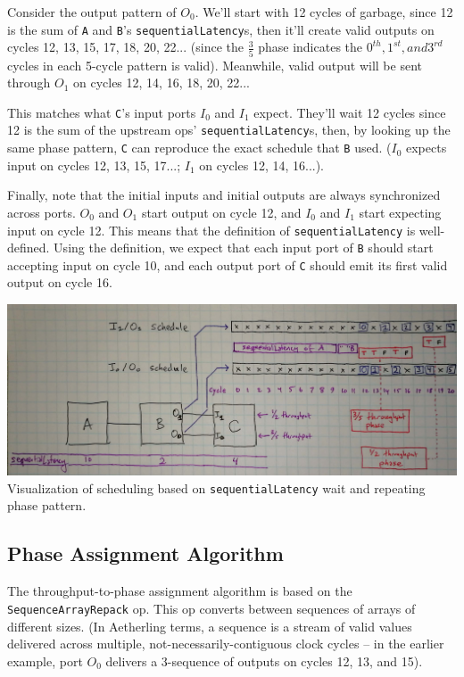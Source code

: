 \documentclass[12pt]{article}
\begin{document}
Consider the output pattern of $O_0$. We'll start with 12 cycles of
garbage, since 12 is the sum of \texttt{A} and \texttt{B}'s
\texttt{sequentialLatency}s, then it'll create valid outputs on cycles
12, 13, 15, 17, 18, 20, 22... (since the $\frac{3}{5}$ phase indicates
the $0^{th}, 1^{st}, and 3^{rd}$ cycles in each 5-cycle pattern is
valid). Meanwhile, valid output will be sent through $O_1$ on cycles
12, 14, 16, 18, 20, 22...

This matches what \texttt{C}'s input ports $I_0$ and $I_1$
expect. They'll wait 12 cycles since 12 is the sum of the upstream
ops' \texttt{sequentialLatency}s, then, by looking up the same phase
pattern, \texttt{C} can reproduce the exact schedule that \texttt{B}
used. ($I_0$ expects input on cycles 12, 13, 15, 17...; $I_1$ on
cycles 12, 14, 16...).

Finally, note that the initial inputs and initial outputs are always
synchronized across ports. $O_0$ and $O_1$ start output on cycle 12,
and $I_0$ and $I_1$ start expecting input on cycle 12. This means that
the definition of \texttt{sequentialLatency} is well-defined. Using
the definition, we expect that each input port of \texttt{B} should
start accepting input on cycle 10, and each output port of \texttt{C}
should emit its first valid output on cycle 16.

\begin{center}
\includegraphics[width=1.0\linewidth]{Figures/phase.jpg}
Visualization of scheduling based on \texttt{sequentialLatency}
wait and repeating phase pattern.
\end{center}

\subsection{Phase Assignment Algorithm}

The throughput-to-phase assignment algorithm is based on the
\texttt{SequenceArrayRepack} op. This op converts between
sequences of arrays of different sizes. (In Aetherling terms, a
sequence is a stream of valid values delivered across multiple,
not-necessarily-contiguous clock cycles -- in the earlier
example, port $O_0$ delivers a 3-sequence of outputs on cycles
12, 13, and 15).
\end{document}
